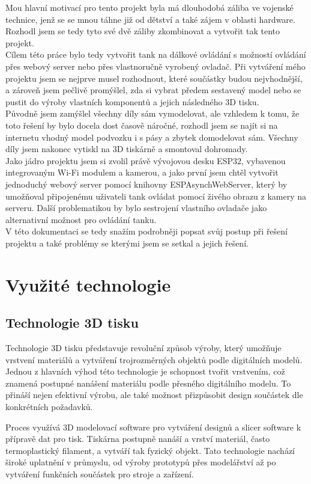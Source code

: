 \documentclass[12pt, a4paper,
oneside
openany
]{report}
\begin{document}
\noindent Mou hlavní motivací pro tento projekt byla má dlouhodobá záliba ve vojenské technice, jenž se se mnou táhne již od dětství a také zájem v oblasti hardware. Rozhodl jsem se tedy tyto své dvě záliby zkombinovat a vytvořit tak tento projekt. \\
Cílem této práce bylo tedy vytvořit tank na dálkové ovládání s možností ovládání přes webový server nebo přes vlastnoručně vyrobený ovladač.
Při vytváření mého projektu jsem se nejprve musel rozhodnout, které součástky budou nejvhodnější, a zároveň jsem pečlivě promýšlel, zda si vybrat předem sestavený model nebo se pustit do výroby vlastních komponentů a jejich následného 3D tisku.\\
Původně jsem zamýšlel všechny díly sám vymodelovat, ale vzhledem k tomu, že toto řešení by bylo docela dost časově náročné, rozhodl jsem se najít si na internetu vhodný model podvozku i s pásy a zbytek domodelovat sám. Všechny díly jsem nakonec vytiskl na 3D tiskárně a smontoval dohromady.\\
Jako jádro projektu jsem si zvolil právě vývojovou desku ESP32, vybavenou integrovaným Wi-Fi modulem a kamerou, a jako první jsem chtěl vytvořit jednoduchý webový server pomocí knihovny ESPAsynchWebServer, který by umožňoval připojenému uživateli tank ovládat pomocí živého obrazu z kamery na serveru. Další problematikou by bylo sestrojení vlastního ovladače jako alternativní možnost pro ovládání tanku.\\
V této dokumentaci se tedy snažím podrobněji popsat svůj postup při řešení projektu a také problémy se kterými jsem se setkal a jejich řešení. 

\chapter{Využité technologie}

\section{Technologie 3D tisku}
\noindent Technologie 3D tisku představuje revoluční způsob výroby, který umožňuje vrstvení materiálů a vytváření trojrozměrných objektů podle digitálních modelů. Jednou z hlavních výhod této technologie je schopnost tvořit vrstvením, což znamená postupné nanášení materiálu podle přesného digitálního modelu. To přináší nejen efektivní výrobu, ale také možnost přizpůsobit design součástek dle konkrétních požadavků.

\noindent Proces využívá 3D modelovací software pro vytváření designů a slicer software k přípravě dat pro tisk. Tiskárna postupně nanáší a vrství materiál, často termoplastický filament, a vytváří tak fyzický objekt. Tato technologie nachází široké uplatnění v průmyslu, od výroby prototypů přes modelářství až po vytváření funkčních součástek pro stroje a zařízení. 
\end{document}
